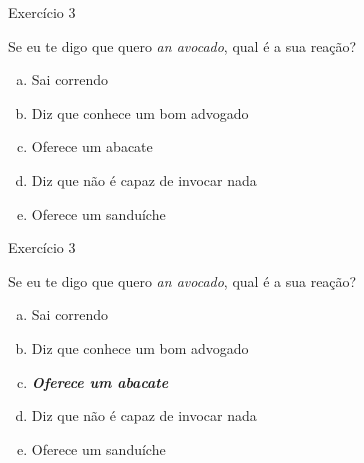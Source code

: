 \documentclass[compress,mathserif]{beamer}
\begin{document}

\begin{frame}{Exercício 3}

Se eu te digo que quero \textit{an avocado}, qual é a sua reação?

\begin{enumerate}[a)]
    \item Sai correndo
    \item Diz que conhece um bom advogado
    \item Oferece um abacate
    \item Diz que não é capaz de invocar nada
    \item Oferece um sanduíche
\end{enumerate}

\end{frame}


\begin{frame}{Exercício 3}

Se eu te digo que quero \textit{an avocado}, qual é a sua reação?

\begin{enumerate}[a)]
    \item Sai correndo
    \item Diz que conhece um bom advogado
    \item \textit{\textbf{Oferece um abacate}}
    \item Diz que não é capaz de invocar nada
    \item Oferece um sanduíche
\end{enumerate}

\end{frame}
\end{document}
